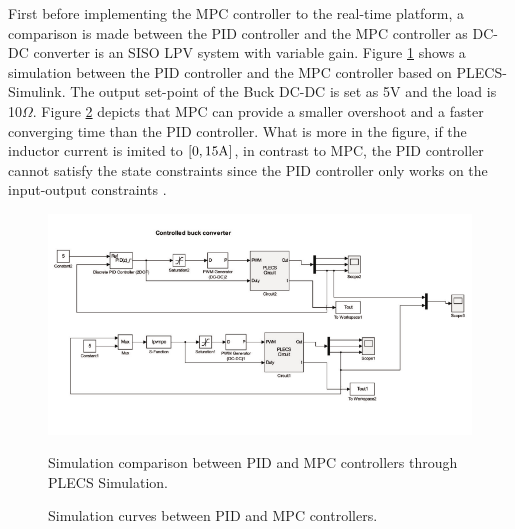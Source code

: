\documentclass[journal]{IEEEtran}
\begin{document}
First before implementing the MPC controller to the real-time platform, a comparison is made between the PID controller and the MPC controller as DC-DC converter is an SISO LPV system with variable gain. Figure \ref{fig:pidmpcsi} shows a simulation between the PID controller and the MPC controller based on PLECS-Simulink.  The output set-point of the Buck DC-DC is set as 5V and the load is 10$\Omega$. Figure \ref{fig:1} depicts that MPC can provide a smaller overshoot and a faster converging time than the PID controller. What is more in the figure, if the inductor current is imited to $\left[ 0,15\rm {A} \right]$, in contrast to MPC, the PID controller cannot satisfy the state constraints since the PID controller only works on the input-output constraints \cite{afram2014theory}.
\begin{figure}
	\centering
	\includegraphics[width=7in]{picture/lz123.pdf}\\
	\caption{Simulation comparison between PID and MPC controllers through PLECS Simulation.}\label{fig:pidmpcsi}
\end{figure}
\begin{figure}\centering
	\hspace{0.5in}
	\caption{Simulation curves between PID and MPC controllers. }
	\label{fig:1}
\end{figure}
\end{document}
